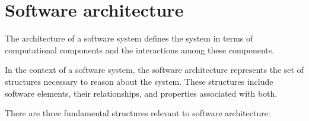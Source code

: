 \section{Software architecture}

\begin{definition}
    The architecture of a software system defines the system in terms of computational components and the interactions among these components.
\end{definition}
\begin{definition}
    In the context of a software system, the software architecture represents the set of structures necessary to reason about the system. 
    These structures include software elements, their relationships, and properties associated with both.
\end{definition}
There are three fundamental structures relevant to software architecture:
